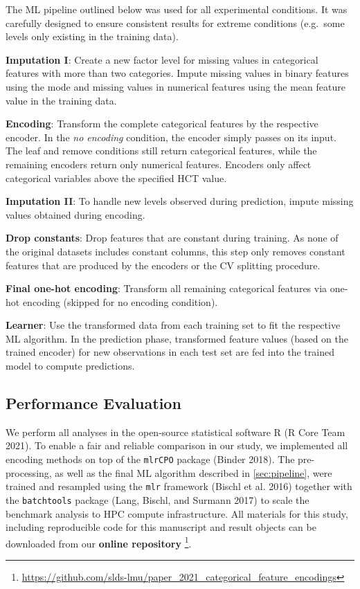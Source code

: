 \documentclass[smallextended]{svjour3}       %
\begin{document}
The ML pipeline outlined below was used for all experimental conditions.
It was carefully designed to ensure consistent results for extreme conditions (e.g.~some levels only existing in the training data).

\textbf{Imputation I}: Create a new factor level for missing values in categorical features with more than two categories. Impute missing values in binary features using the mode and missing values in numerical features using the mean feature value in the training data.

\textbf{Encoding}: Transform the complete categorical features by the respective encoder.
In the \textit{no encoding} condition, the encoder simply passes on its input.
The leaf and remove conditions still return categorical features, while the remaining encoders return only numerical features. Encoders only affect categorical variables above the specified HCT value.

\textbf{Imputation II}: To handle new levels observed during prediction, impute missing values obtained during encoding.

\textbf{Drop constants}: Drop features that are constant during training. As none of the original datasets includes constant columns, this step only removes constant features that are produced by the encoders or the CV splitting procedure.

\textbf{Final one-hot encoding}: Transform all remaining
categorical features via one-hot encoding (skipped for no encoding condition).

\textbf{Learner}: Use the transformed data from each training set to fit the respective ML algorithm.
In the prediction phase, transformed feature values (based on the trained encoder) for new observations in each test set are fed into the trained model to compute predictions.

\hypertarget{performance-evaluation}{%
\subsection{Performance Evaluation}\label{performance-evaluation}}

We perform all analyses in the open-source statistical software R (R Core Team 2021).
To enable a fair and reliable comparison in our study, we implemented all encoding methods on top of the \texttt{mlrCPO} package (Binder 2018).
The pre-processing, as well as the final ML algorithm described in \ref{sec:pipeline}, were trained and resampled using the \texttt{mlr} framework (Bischl et al. 2016) together with the \texttt{batchtools} package (Lang, Bischl, and Surmann 2017) to scale the benchmark analysis to HPC compute infrastructure.
All materials for this study, including reproducible code for this manuscript and result objects can be downloaded from our \textbf{online repository} \footnote{\url{https://github.com/slds-lmu/paper_2021_categorical_feature_encodings}}.
\end{document}
